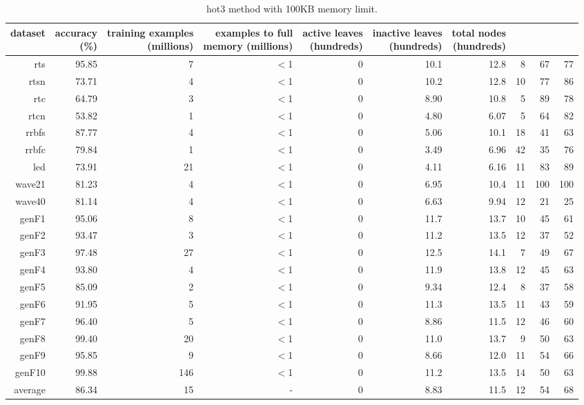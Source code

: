 \begin{table}
\caption{{\sc hot3} method with 100KB memory limit.}
\label{tab:hot3-100k}
\centering
\begin{tabular}{|r|r|r|r|r|r|r|r|r|r|}
\hline
dataset	&
\rotatebox{90}{\parbox{9em}{accuracy\\(\%)}} &
\rotatebox{90}{\parbox{9em}{training examples\\(millions)}} &
\rotatebox{90}{\parbox{9em}{examples to full\\memory (millions)}} &
\rotatebox{90}{\parbox{9em}{active leaves\\(hundreds)}} &
\rotatebox{90}{\parbox{9em}{inactive leaves\\(hundreds)}} &
\rotatebox{90}{\parbox{9em}{total nodes\\(hundreds)}} &
\rotatebox{90}{\parbox{9em}{tree depth}}	&
\rotatebox{90}{\parbox{9em}{training speed (\%)}} &
\rotatebox{90}{\parbox{9em}{prediction speed (\%)}} \\
\hline
{\sc rts} & 95.85 & 7 & $<$1 & 0 & 10.1 & 12.8 & 8 & 67 & 77 \\
{\sc rtsn} & 73.71 & 4 & $<$1 & 0 & 10.2 & 12.8 & 10 & 77 & 86 \\
{\sc rtc} & 64.79 & 3 & $<$1 & 0 & 8.90 & 10.8 & 5 & 89 & 78 \\
{\sc rtcn} & 53.82 & 1 & $<$1 & 0 & 4.80 & 6.07 & 5 & 64 & 82 \\
{\sc rrbfs} & 87.77 & 4 & $<$1 & 0 & 5.06 & 10.1 & 18 & 41 & 63 \\
{\sc rrbfc} & 79.84 & 1 & $<$1 & 0 & 3.49 & 6.96 & 42 & 35 & 76 \\
{\sc led} & 73.91 & 21 & $<$1 & 0 & 4.11 & 6.16 & 11 & 83 & 89 \\
{\sc wave21} & 81.23 & 4 & $<$1 & 0 & 6.95 & 10.4 & 11 & 100 & 100 \\
{\sc wave40} & 81.14 & 4 & $<$1 & 0 & 6.63 & 9.94 & 12 & 21 & 25 \\
{\sc genF1} & 95.06 & 8 & $<$1 & 0 & 11.7 & 13.7 & 10 & 45 & 61 \\
{\sc genF2} & 93.47 & 3 & $<$1 & 0 & 11.2 & 13.5 & 12 & 37 & 52 \\
{\sc genF3} & 97.48 & 27 & $<$1 & 0 & 12.5 & 14.1 & 7 & 49 & 67 \\
{\sc genF4} & 93.80 & 4 & $<$1 & 0 & 11.9 & 13.8 & 12 & 45 & 63 \\
{\sc genF5} & 85.09 & 2 & $<$1 & 0 & 9.34 & 12.4 & 8 & 37 & 58 \\
{\sc genF6} & 91.95 & 5 & $<$1 & 0 & 11.3 & 13.5 & 11 & 43 & 59 \\
{\sc genF7} & 96.40 & 5 & $<$1 & 0 & 8.86 & 11.5 & 12 & 46 & 60 \\
{\sc genF8} & 99.40 & 20 & $<$1 & 0 & 11.0 & 13.7 & 9 & 50 & 63 \\
{\sc genF9} & 95.85 & 9 & $<$1 & 0 & 8.66 & 12.0 & 11 & 54 & 66 \\
{\sc genF10} & 99.88 & 146 & $<$1 & 0 & 11.2 & 13.5 & 14 & 50 & 63 \\
\hline
average & 86.34 & 15 &  -  & 0 & 8.83 & 11.5 & 12 & 54 & 68 \\
\hline
\end{tabular}
\end{table}
